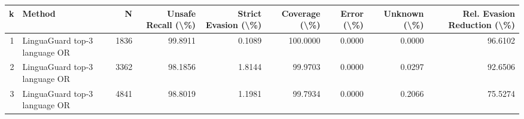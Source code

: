 \begin{tabular}{rlrrrrrrr}
\toprule
k & Method & N & Unsafe Recall (\textbackslash \%) & Strict Evasion (\textbackslash \%) & Coverage (\textbackslash \%) & Error (\textbackslash \%) & Unknown (\textbackslash \%) & Rel. Evasion Reduction (\textbackslash \%) \\
\midrule
1 & LinguaGuard top-3 language OR & 1836 & 99.8911 & 0.1089 & 100.0000 & 0.0000 & 0.0000 & 96.6102 \\
2 & LinguaGuard top-3 language OR & 3362 & 98.1856 & 1.8144 & 99.9703 & 0.0000 & 0.0297 & 92.6506 \\
3 & LinguaGuard top-3 language OR & 4841 & 98.8019 & 1.1981 & 99.7934 & 0.0000 & 0.2066 & 75.5274 \\
\bottomrule
\end{tabular}
